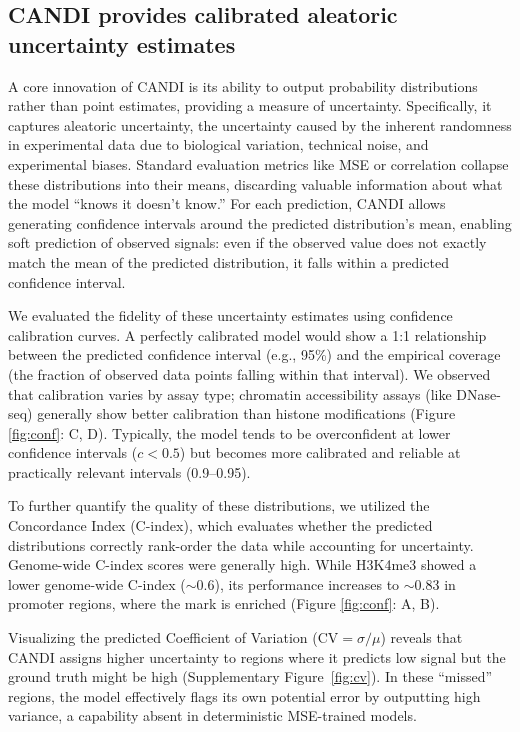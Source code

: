 \subsection{CANDI provides calibrated aleatoric uncertainty estimates}

A core innovation of CANDI is its ability to output probability distributions rather than point estimates, providing a measure of uncertainty. Specifically, it captures aleatoric uncertainty, the uncertainty caused by the inherent randomness in experimental data due to biological variation, technical noise, and experimental biases.  Standard evaluation metrics like MSE or correlation collapse these distributions into their means, discarding valuable information about what the model ``knows it doesn't know.'' For each prediction, CANDI allows generating confidence intervals around the predicted distribution's mean, enabling soft prediction of observed signals: even if the observed value does not exactly match the mean of the predicted distribution, it falls within a predicted confidence interval.

We evaluated the fidelity of these uncertainty estimates using confidence calibration curves. A perfectly calibrated model would show a 1:1 relationship between the predicted confidence interval (e.g., 95\%) and the empirical coverage (the fraction of observed data points falling within that interval). We observed that calibration varies by assay type; chromatin accessibility assays (like DNase-seq) generally show better calibration than histone modifications (Figure \ref{fig:conf}: C, D). Typically, the model tends to be overconfident at lower confidence intervals ($c<0.5$) but becomes more calibrated and reliable at practically relevant intervals (0.9--0.95).

To further quantify the quality of these distributions, we utilized the Concordance Index (C-index), which evaluates whether the predicted distributions correctly rank-order the data while accounting for uncertainty. Genome-wide C-index scores were generally high. While H3K4me3 showed a lower genome-wide C-index ($\sim$0.6), its performance increases to $\sim$0.83 in promoter regions, where the mark is enriched  (Figure \ref{fig:conf}: A, B).

Visualizing the predicted Coefficient of Variation ($\text{CV} = \sigma/\mu$) reveals that CANDI assigns higher uncertainty to regions where it predicts low signal but the ground truth might be high  (Supplementary Figure~\ref{fig:cv}). In these ``missed'' regions, the model effectively flags its own potential error by outputting high variance, a capability absent in deterministic MSE-trained models.



